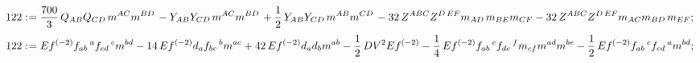 \documentclass[11pt]{article}
\def\specialcolon{\mathrel{\mathop{:}}\hspace{-.5em}}
\begin{document}
\begin{dmath*}[compact, spread=2pt]
122\specialcolon{}= \frac{700}{3}\, {Q}_{A B} {Q}_{C D\, } {m}^{A C} {m}^{B D\, } - {Y}_{A B} {Y}_{C D\, } {m}^{A C} {m}^{B D\, } + \frac{1}{2}\, {Y}_{A B} {Y}_{C D\, } {m}^{A B} {m}^{C D\, } - 32\, {Z}^{A B C} {Z}^{D\,  E F} {m}_{A D\, } {m}_{B E} {m}_{C F} - 32\, {Z}^{A B C} {Z}^{D\,  E F} {m}_{A C} {m}_{B D\, } {m}_{E F};
\end{dmath*}
\begin{dmath*}[compact, spread=2pt]
122\specialcolon{}= Ef{}^{(-2)} {f}_{a b}\,^{a} {f}_{c d}\,^{c} {m}^{b d} - 14\, Ef{}^{(-2)} {d}_{a} {f}_{b c}\,^{b} {m}^{a c} + 42\, Ef{}^{(-2)} {d}_{a} {d}_{b} {m}^{a b} - \frac{1}{2}\, DV{}^{2} Ef{}^{(-2)} - \frac{1}{4}\, Ef{}^{(-2)} {f}_{a b}\,^{c} {f}_{d e}\,^{f} {m}_{c f} {m}^{a d} {m}^{b e} - \frac{1}{2}\, Ef{}^{(-2)} {f}_{a b}\,^{c} {f}_{c d}\,^{a} {m}^{b d};
\end{dmath*}
\end{document}
